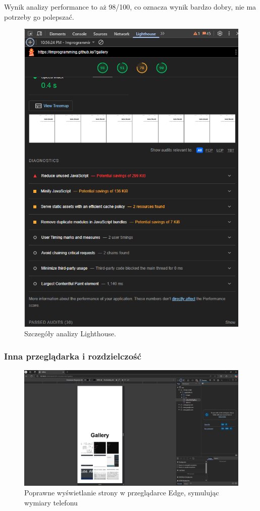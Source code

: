 \documentclass[a4paper,12pt]{article}
\begin{document}
Wynik analizy performance to aż 98/100, co oznacza wynik bardzo dobry, nie ma potrzeby go polepszać.

\begin{figure}[H]
    \centering
    \includegraphics[width=1\textwidth]{images/lighthouse_details.png}
    \caption{Szczegóły analizy Lighthouse.}
\end{figure}

\subsubsection{Inna przeglądarka i rozdzielczość}

\begin{figure}[H]
    \centering
    \includegraphics[width=1\textwidth]{images/edge.png}
    \caption{Poprawne wyświetlanie strony w przeglądarce Edge, symulując wymiary telefonu}
\end{figure}
\end{document}
